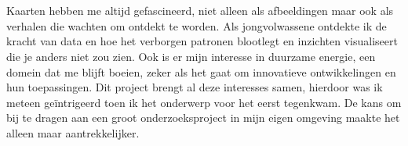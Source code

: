
\chapter*{}%
\label{ch:voorwoord}






Kaarten hebben me altijd gefascineerd, niet alleen als afbeeldingen maar ook als verhalen die wachten om ontdekt te worden. Als jongvolwassene ontdekte ik de kracht van data en hoe het verborgen patronen blootlegt en inzichten visualiseert die je anders niet zou zien. Ook is er mijn interesse in duurzame energie, een domein dat me blijft boeien, zeker als het gaat om innovatieve ontwikkelingen en hun toepassingen.
Dit project brengt al deze interesses samen, hierdoor was ik meteen geïntrigeerd toen ik het onderwerp voor het eerst tegenkwam. De kans om bij te dragen aan een groot onderzoeksproject in mijn eigen omgeving maakte het alleen maar aantrekkelijker.\medskip

